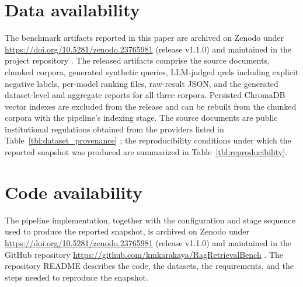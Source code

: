
\section*{Data availability}

The benchmark artifacts reported in this paper are archived on Zenodo under
\url{https://doi.org/10.5281/zenodo.23765981} (release v1.1.0) \citep{Zenodo_RagRetrievalBench}
and maintained in the project repository \citep{GitHub_RagRetrievalBench}. The released artifacts comprise the source documents,
chunked corpora, generated synthetic queries, LLM-judged qrels including explicit negative
labels, per-model ranking files, raw-result JSON, and the generated dataset-level and
aggregate reports for all three corpora. Persisted ChromaDB vector indexes are excluded from
the release and can be rebuilt from the chunked corpora with the pipeline's indexing stage.
The source documents are public institutional regulations obtained from the providers listed
in Table~\ref{tbl:dataset_provenance} \citep{TED_Regulations, TED_Regulations_TR, BDDK_Mevzuat}; the
reproducibility conditions under which the reported snapshot was produced are summarized in
Table~\ref{tbl:reproducibility}.

\section*{Code availability}

The pipeline implementation, together with the configuration and stage sequence used to
produce the reported snapshot, is archived on Zenodo under
\url{https://doi.org/10.5281/zenodo.23765981} (release v1.1.0) \citep{Zenodo_RagRetrievalBench}
and maintained in the GitHub repository \url{https://github.com/kmkarakaya/RagRetrievalBench}
\citep{GitHub_RagRetrievalBench}. The repository README describes the code, the datasets,
the requirements, and the steps needed to reproduce the snapshot.

